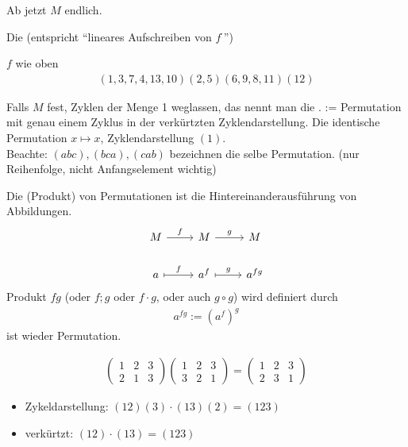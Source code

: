 Ab jetzt $M$ endlich.
\begin{definition}
	Die  (entspricht ``lineares Aufschreiben von $f^{\cdot}$'')
\end{definition}
\begin{example}
	$f$ wie oben
	\begin{align*}
		(1,3,7,4,13, 10)(2,5)(6,9,8,11)(12)	
	\end{align*}
\end{example}
Falls $M$ fest, Zyklen der Menge 1 weglassen, das nennt man die .  := Permutation mit genau einem Zyklus in der verkürtzten Zyklendarstellung. Die identische Permutation $x \mapsto x$, Zyklendarstellung $(1)$.\\
Beachte: $(abc),(bca),(cab)$ bezeichnen die selbe Permutation. (nur Reihenfolge, nicht Anfangselement wichtig)
\begin{definition}
	Die  (Produkt) von Permutationen ist die Hintereinanderausführung von Abbildungen.
	\[
	\begin{tikzcd}
		M \arrow[r, "f"]     & M \arrow[r, "g"]       & M      \\
		a \arrow[r, maps to, "f"] & a^f \arrow[r, maps to, "g"] & a^{fg}
	\end{tikzcd}
	\]
	Produkt $fg$ (oder $f;g$ oder $f\cdot g$, oder auch $g \circ g$) wird definiert durch 
	\begin{align*}
		a^{fg}:= (a^f)^g
	\end{align*} 
	ist wieder Permutation.
\end{definition}
\begin{example}
	\begin{align*}
		\begin{pmatrix}
			1 & 2 &3\\
			2 & 1 &3
		\end{pmatrix}
		\begin{pmatrix}
			1 & 2 & 3\\
			3 & 2 & 1
		\end{pmatrix}=
		\begin{pmatrix}
			1 & 2 & 3\\
			2 & 3 & 1
		\end{pmatrix}
	\end{align*}
	\begin{itemize}
		\item Zykeldarstellung: $(12)(3)\cdot (13)(2) = (123)$
		\item verkürtzt: $(12)\cdot(13) = (123)$ 
	\end{itemize}
\end{example}
